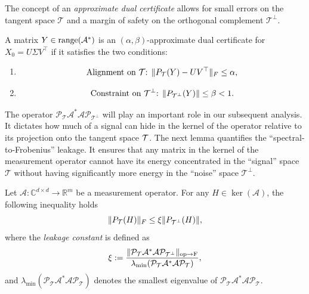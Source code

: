 The concept of an {\em approximate dual certificate} allows for small errors on the tangent space $\mathcal{T}$ and a margin of safety on the orthogonal complement $\mathcal{T}^\perp$.

\begin{definition}\label{de:approxdual}
A matrix $Y \in \operatorname{range}(\mathcal{A}^*)$ is an $(\alpha, \beta)$-approximate dual certificate for $X_0 = U\Sigma V^\top$ if it satisfies the two conditions:
\begin{enumerate}
\item \begin{equation}\label{eq:dualalpha}
\text{Alignment on $\mathcal{T}$: $\|P_{\mathcal{T}}(Y) - UV^\top\|_F \le \alpha$,}
\end{equation}
\item 
\begin{equation}\label{eq:dualbeta}
\text{Constraint on $\mathcal{T}^\perp$: $\|P_{\mathcal{T}^\perp}(Y)\| \le \beta < 1$.}
\end{equation}
\end{enumerate}
\end{definition}

\medskip
The operator $\mathcal{P}_{\mathcal{T}} \mathcal{A}^* \mathcal{A} \mathcal{P}_{\mathcal{T}^\perp}$ will play an important role in our subsequent analysis. It dictates how much of a signal can hide in the kernel of the operator relative to its projection onto the tangent space $\mathcal{T}$.
The next lemma quantifies the ``spectral-to-Frobenius'' leakage. It ensures that any matrix in the kernel of the measurement operator cannot have its energy concentrated in the ``signal'' space $\mathcal{T}$ without having significantly more energy in the ``noise'' space $\mathcal{T}^\perp$.

\begin{lemma}\label{le:leakage}
Let $\mathcal{A}: \mathbb{C}^{d \times d} \to \mathbb{R}^m$ be a measurement operator. For any $H \in \ker(\mathcal{A})$, the following inequality holds
$$\|P_{\mathcal{T}}(H)\|_F \le \xi \|P_{\mathcal{T}^\perp}(H)\|,$$
where the {\em leakage constant} is defined as 
$$\xi := \frac{\|\mathcal{P}_{\mathcal{T}} \mathcal{A}^* \mathcal{A} \mathcal{P}_{\mathcal{T}^\perp}\|_{\text{op} \to \text{F}}}{\lambda_{\min}(\mathcal{P}_{\mathcal{T}} \mathcal{A}^* \mathcal{A} \mathcal{P}_{\mathcal{T}})},$$
and $\lambda_{\min}(\mathcal{P}_{\mathcal{T}} \mathcal{A}^* \mathcal{A} \mathcal{P}_{\mathcal{T}})$ denotes the smallest eigenvalue of $\mathcal{P}_{\mathcal{T}} \mathcal{A}^* \mathcal{A} \mathcal{P}_{\mathcal{T}}$.
\end{lemma}

